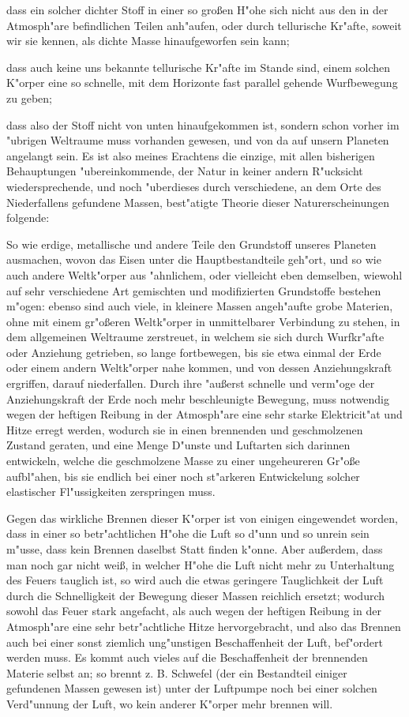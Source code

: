 \documentclass[a4paper, 11pt, oneside, polutonikogreek, german]{article}
\begin{document}
dass ein solcher dichter Stoff in einer so großen H"ohe sich nicht aus den in der Atmosph"are befindlichen Teilen anh"aufen, oder durch tellurische Kr"afte, soweit wir sie kennen, als dichte Masse hinaufgeworfen sein kann;

dass auch keine uns bekannte tellurische Kr"afte im Stande sind, einem solchen K"orper eine so schnelle, mit dem Horizonte fast parallel gehende Wurfbewegung zu geben;

dass also der Stoff nicht von unten hinaufgekommen ist, sondern schon vorher im "ubrigen Weltraume muss vorhanden gewesen, und von da auf unsern Planeten angelangt sein. Es ist also meines Erachtens die einzige, mit allen bisherigen Behauptungen "ubereinkommende, der Natur in keiner andern R"ucksicht wiedersprechende, und noch "uberdieses durch verschiedene, an dem Orte des Niederfallens gefundene Massen, best"atigte Theorie dieser Naturerscheinungen folgende:

So wie erdige, metallische und andere Teile den Grundstoff unseres Planeten ausmachen, wovon das Eisen unter die Hauptbestandteile geh"ort, und so wie auch andere Weltk"orper aus "ahnlichem, oder vielleicht eben demselben, wiewohl auf sehr verschiedene Art gemischten und modifizierten Grundstoffe bestehen m"ogen: ebenso sind auch viele, in kleinere Massen angeh"aufte grobe Materien, ohne mit einem gr"oßeren Weltk"orper in unmittelbarer Verbindung zu stehen, in dem allgemeinen Weltraume zerstreuet, in welchem sie sich durch Wurfkr"afte oder Anziehung getrieben, so lange fortbewegen, bis sie etwa einmal der Erde oder einem andern Weltk"orper nahe kommen, und von dessen Anziehungskraft ergriffen, darauf niederfallen. Durch ihre "außerst schnelle und verm"oge der Anziehungskraft der Erde noch mehr beschleunigte Bewegung, muss notwendig wegen der heftigen Reibung in der Atmosph"are eine sehr starke Elektricit"at und Hitze erregt werden, wodurch sie in einen brennenden und geschmolzenen Zustand geraten, und eine Menge D"unste und Luftarten sich darinnen entwickeln, welche die geschmolzene Masse zu einer ungeheureren Gr"oße aufbl"ahen, bis sie endlich bei einer noch st"arkeren Entwickelung solcher elastischer Fl"ussigkeiten zerspringen muss.

Gegen das wirkliche Brennen dieser K"orper ist von einigen eingewendet worden, dass in einer so betr"achtlichen H"ohe die Luft so d"unn und so unrein sein m"usse, dass kein Brennen daselbst Statt finden k"onne. Aber außerdem, dass man noch gar nicht weiß, in welcher H"ohe die Luft nicht mehr zu Unterhaltung des Feuers tauglich ist, so wird auch die etwas geringere Tauglichkeit der Luft durch die Schnelligkeit der Bewegung dieser Massen reichlich ersetzt; wodurch sowohl das Feuer stark angefacht, als auch wegen der heftigen Reibung in der Atmosph"are eine sehr betr"achtliche Hitze hervorgebracht, und also das Brennen auch bei einer sonst ziemlich ung"unstigen Beschaffenheit der Luft, bef"ordert werden muss. Es kommt auch vieles auf die Beschaffenheit der brennenden Materie selbst an; so brennt z. B. Schwefel (der ein Bestandteil einiger gefundenen Massen gewesen ist) unter der Luftpumpe noch bei einer solchen Verd"unnung der Luft, wo kein anderer K"orper mehr brennen will.
\clearpage
\end{document}
